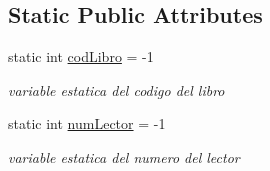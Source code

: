 \subsection*{Static Public Attributes}
\begin{DoxyCompactItemize}
\item 
static int \hyperlink{classv_agregar_prestamo_a82beccc02f45e937cae62e68b00fba6b}{cod\+Libro} = -\/1\hypertarget{classv_agregar_prestamo_a82beccc02f45e937cae62e68b00fba6b}{}\label{classv_agregar_prestamo_a82beccc02f45e937cae62e68b00fba6b}

\begin{DoxyCompactList}\small\item\em variable estatica del codigo del libro \end{DoxyCompactList}\item 
static int \hyperlink{classv_agregar_prestamo_a8bd94dc889e369f2dfff0f47d9e862d5}{num\+Lector} = -\/1\hypertarget{classv_agregar_prestamo_a8bd94dc889e369f2dfff0f47d9e862d5}{}\label{classv_agregar_prestamo_a8bd94dc889e369f2dfff0f47d9e862d5}

\begin{DoxyCompactList}\small\item\em variable estatica del numero del lector \end{DoxyCompactList}\end{DoxyCompactItemize}
